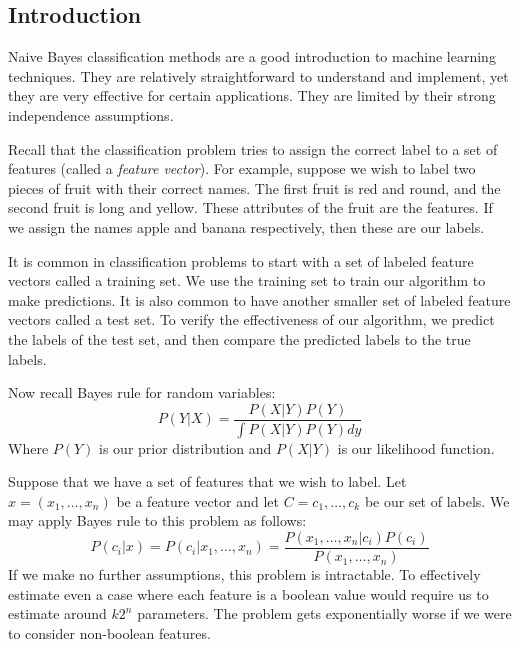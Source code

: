 \label{Ch:NaiveBayes}



%
%	
%	
%	
%

\subsection*{Introduction}

Naive Bayes classification methods are a good introduction to machine learning techniques.
They are relatively straightforward to understand and implement, yet they are very effective for certain applications.
They are limited by their strong independence assumptions.

Recall that the classification problem tries to assign the correct label to a set of features
(called a \emph{feature vector}).
For example, suppose we wish to label two pieces of fruit with their correct names.
The first fruit is red and round, and the second fruit is long and yellow.
These attributes of the fruit are the features.
If we assign the names apple and banana respectively, then these are our labels.

It is common in classification problems to start with a set of labeled feature vectors called a training set.
We use the training set to train our algorithm to make predictions.
It is also common to have another smaller set of labeled feature vectors called a test set.
To verify the effectiveness of our algorithm, we predict the labels of the test set, and then compare the predicted labels to the true labels.

Now recall Bayes rule for random variables:
\[
P(Y|X) = \frac{P(X|Y)P(Y)}{\int P(X|Y)P(Y) dy}
\]
Where $P(Y)$ is our prior distribution and $P(X|Y)$ is our likelihood function.

Suppose that we have a set of features that we wish to label.
Let $x = (x_1, \ldots, x_n)$ be a feature vector and let $C = {c_1, \ldots, c_k}$ be our set of labels.
We may apply Bayes rule to this problem as follows:
\[
P(c_i|x) = P(c_i | x_1, \ldots, x_n)  = \frac{P(x_1, \ldots, x_n|c_i)P(c_i)}{P(x_1, \ldots, x_n)}
\]
If we make no further assumptions, this problem is intractable.
To effectively estimate even a case where each feature is a boolean value would require us to estimate around $k2^{n}$ parameters.
The problem gets exponentially worse if we were to consider non-boolean features.

